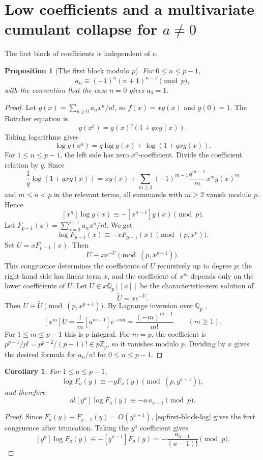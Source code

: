 \documentclass[11pt]{amsart}
\numberwithin{equation}{section}
\newtheorem{proposition}[proposition]{Proposition}
\newtheorem{corollary}[corollary]{Corollary}
\newcommand{\Qp}{\mathbb{Q}_p}
\newcommand{\Zp}{\mathbb{Z}_p}
\newcommand{\bigo}{O}
\begin{document}
\section{Low coefficients and a multivariate cumulant collapse for \texorpdfstring{$a\ne0$}{a not equal 0}}\label{sec:cumulant}
The first block of coefficients is independent of $e$.

\begin{proposition}[The first block modulo $p$]\label{prop:first-block}
For $0\le n\le p-1$,
\[
        a_n\equiv (-1)^n(n+1)^{n-1}\pmod p,
\]
with the convention that the case $n=0$ gives $a_0=1$.
\end{proposition}
\begin{proof}
Let $g(x)=\sum_{n\ge0}a_nx^n/n!$, so $f(x)=xg(x)$ and $g(0)=1$.  The B\"ottcher equation is
\[
        g(x^q)=g(x)^q(1+qxg(x)).
\]
Taking logarithms gives
\[
        \log g(x^q)=q\log g(x)+\log(1+qxg(x)).
\]
For $1\le n\le p-1$, the left side has zero $x^n$-coefficient.  Divide the coefficient relation by $q$.  Since
\[
        \frac1q\log(1+qxg(x))=xg(x)+\sum_{m\ge2}(-1)^{m-1}\frac{q^{m-1}}{m}x^mg(x)^m
\]
and $m\le n<p$ in the relevant terms, all summands with $m\ge2$ vanish modulo $p$.  Hence
\[
        [x^n]\log g(x)\equiv-[x^{n-1}]g(x)\pmod p.
\]
Let $F_{p-1}(x)=\sum_{n=0}^{p-1}a_nx^n/n!$.  We get
\begin{equation}\label{eq:first-block-log}
        \log F_{p-1}(x)\equiv -xF_{p-1}(x)\pmod{(p,x^p)}.
\end{equation}
Set $U=xF_{p-1}(x)$.  Then
\[
        U\equiv xe^{-U}\pmod{(p,x^{p+1})}.
\]
This congruence determines the coefficients of $U$ recursively up to degree $p$: the right-hand side has linear term $x$, and the coefficient of $x^m$ depends only on the lower coefficients of $U$.  Let $\widetilde U\in x\Qp[[x]]$ be the characteristic-zero solution of
\[
        \widetilde U=xe^{-\widetilde U}.
\]
Then $U\equiv \widetilde U\pmod{(p,x^{p+1})}$.  By Lagrange inversion over $\Qp$ \cite{Gessel,SuryaWarnke},
\[
        [x^m]\widetilde U=\frac1m[u^{m-1}]e^{-mu}=\frac{(-m)^{m-1}}{m!}\qquad(m\ge1).
\]
For $1\le m\le p-1$ this is $p$-integral.  For $m=p$, the coefficient is $p^{p-1}/p!=p^{p-2}/(p-1)!\in p\Zp$, so it vanishes modulo $p$.  Dividing by $x$ gives the desired formula for $a_n/n!$ for $0\le n\le p-1$.
\end{proof}

\begin{corollary}\label{cor:log-Fa}
For $1\le a\le p-1$,
\[
        \log F_a(y)\equiv -yF_a(y)\pmod{(p,y^{a+1})},
\]
and therefore
\[
        a![y^a]\log F_a(y)\equiv -a\,a_{a-1}\pmod p.
\]
\end{corollary}
\begin{proof}
Since $F_a(y)-F_{p-1}(y)=\bigo(y^{a+1})$, \eqref{eq:first-block-log} gives the first congruence after truncation.  Taking the $y^a$ coefficient gives
\[
        [y^a]\log F_a(y)\equiv-[y^{a-1}]F_a(y)=-\frac{a_{a-1}}{(a-1)!}\pmod p.
\]
\end{proof}
\end{document}
